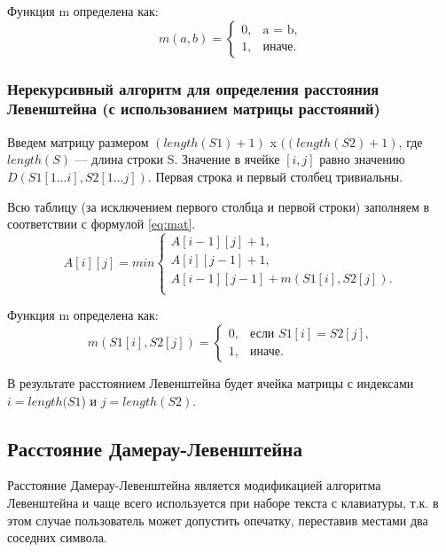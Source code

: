 Функция m определена как:
\begin{equation}
	\label{eq:m}
	m(a, b) = \begin{cases}
		0, &\text{a = b},\\
		1, &\text{иначе}.
	\end{cases}
\end{equation}

\subsubsection{Нерекурсивный алгоритм для определения расстояния Левенштейна (с использованием матрицы расстояний)}
Введем матрицу размером $(length(S1)+ 1)$ x $((length(S2) + 1)$, где $length(S)$ — длина строки S. Значение в ячейке $[i, j]$ равно значению\newline
$D(S1[1...i], S2[1...j])$. Первая строка и первый столбец тривиальны. 

Всю таблицу (за исключением первого столбца и первой строки) заполняем в соответствии с формулой \ref{eq:mat}.
\begin{equation}
	\label{eq:mat}
	A[i][j] = min \begin{cases}
		A[i-1][j] + 1,\\
		 A[i][j-1] + 1,\\
		 A[i-1][j-1] + m(S1[i], S2[j]).\\
	 \end{cases}
 \end{equation}

Функция m определена как:
\begin{equation}
\label{eq:m2}
m(S1[i], S2[j]) = \begin{cases}
0, &\text{если $S1[i] = S2[j]$,}\\
1, &\text{иначе.}
\end{cases}
\end{equation}
 
В результате расстоянием Левенштейна будет ячейка матрицы с индексами $i = length(S1$) и $j = length(S2)$.

\subsection{Расстояние Дамерау-Левенштейна}
Расстояние Дамерау-Левенштейна является модификацией алгоритма Левенштейна и чаще всего используется при наборе текста с клавиатуры, т.к. в этом случае пользователь может допустить опечатку, переставив местами два соседних символа. 

